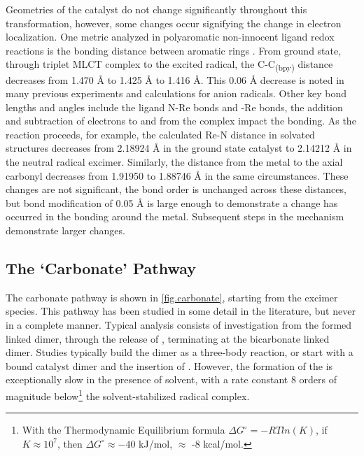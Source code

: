 


Geometries of the catalyst do not change significantly throughout this transformation, however, some changes occur signifying the change in electron localization. One metric analyzed in polyaromatic non-innocent ligand redox reactions is the bonding distance between aromatic rings \autocite{bokarev2014}. From ground state, through triplet MLCT complex to the excited radical, the C-C\textsubscript{(bpy)} distance decreases from 1.470 \r{A} to 1.425 \r{A} to 1.416 \r{A}. This 0.06 \r{A} decrease is noted in many previous experiments and calculations for anion radicals\autocite{bokarev2014, chisholm1981, castellaventura2000, gorerandall2009, irwin2010}. Other key bond lengths and angles include the ligand N-Re bonds and -Re bonds, the addition and subtraction of electrons to and from the complex impact the bonding. As the reaction proceeds, for example, the calculated Re-N distance in solvated structures decreases from 2.18924 \r{A} in the ground state catalyst to 2.14212 \r{A} in the neutral radical excimer. Similarly, the distance from the metal to the axial carbonyl decreases from 1.91950 to 1.88746 \r{A} in the same circumstances. These changes are not significant, the bond order is unchanged across these distances, but bond modification of 0.05 \r{A} is large enough to demonstrate a change has occurred in the bonding around the metal. Subsequent steps in the mechanism demonstrate larger changes.

\subsection{The `Carbonate' Pathway}\label{ss.carbonate}

The carbonate pathway is shown in \autoref{fig.carbonate}, starting from the excimer species. This pathway has been studied in some detail in the literature, but never in a complete manner. Typical analysis consists of investigation from the formed  linked dimer, through the release of , terminating at the bicarbonate linked dimer. Studies typically build the dimer as a three-body reaction, or start with a  bound catalyst dimer and the insertion of . However, the formation of the   is exceptionally slow in the presence of solvent, with a rate constant 8 orders of magnitude below\footnote{With the Thermodynamic Equilibrium formula $\Delta G^\circ = -RT ln(K)$, if $K \approx 10^7$, then $\Delta G^\circ \approx -40$ kJ/mol, $\approx$ -8 kcal/mol.} the solvent-stabilized radical  complex\autocite{fujita2004}. 

